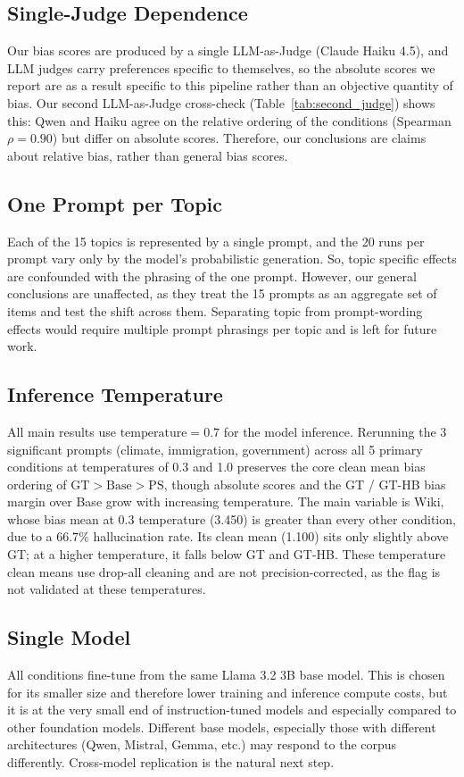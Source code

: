 \documentclass[12pt]{article}
\begin{document}
\subsection{Single-Judge Dependence}
Our bias scores are produced by a single LLM-as-Judge (Claude Haiku 4.5), and LLM judges carry preferences specific to themselves, so the absolute scores we report are as a result specific to this pipeline rather than an objective quantity of bias.
Our second LLM-as-Judge cross-check (Table~\ref{tab:second_judge}) shows this: Qwen and Haiku agree on the relative ordering of the conditions (Spearman $\rho=0.90$) but differ on absolute scores.
Therefore, our conclusions are claims about relative bias, rather than general bias scores.

\subsection{One Prompt per Topic}
Each of the 15 topics is represented by a single prompt, and the 20 runs per prompt vary only by the model's probabilistic generation.
So, topic specific effects are confounded with the phrasing of the one prompt. 
However, our general conclusions are unaffected, as they treat the 15 prompts as an aggregate set of items and test the shift across them.
Separating topic from prompt-wording effects would require multiple prompt phrasings per topic and is left for future work.

\subsection{Inference Temperature}
All main results use $\mathrm{temperature} = 0.7$ for the model inference.
Rerunning the 3 significant prompts (climate, immigration, government) across all 5 primary conditions at temperatures of 0.3 and 1.0 preserves the core clean mean bias ordering of $\mathrm{GT} > \mathrm{Base} > \mathrm{PS}$, though absolute scores and the GT / GT-HB bias margin over Base grow with increasing temperature. 
The main variable is Wiki, whose bias mean at 0.3 temperature (3.450) is greater than every other condition, due to a $66.7\%$ hallucination rate. 
Its clean mean (1.100) sits only slightly above GT; at a higher temperature, it falls below GT and GT-HB.
These temperature clean means use drop-all cleaning and are not precision-corrected, as the flag is not validated at these temperatures.

\subsection{Single Model}
All conditions fine-tune from the same Llama 3.2 3B base model. This is chosen for its smaller size and therefore lower training and inference compute costs, but it is at the very small end of instruction-tuned models and especially compared to other foundation models. 
Different base models, especially those with different architectures (Qwen, Mistral, Gemma, etc.) may respond to the corpus differently. 
Cross-model replication is the natural next step.
\end{document}
